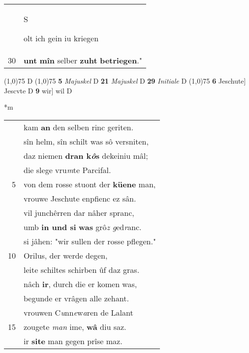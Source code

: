 \documentclass[8pt,a4paper,notitlepage]{article}
\begin{document}
\begin{table}[ht]
\begin{minipage}[t]{0.5\linewidth}
\begin{tabular}{rl}
 & \begin{large}S\end{large}olt ich gein iu kriegen\\ 
30 & \textbf{unt} \textbf{mîn} selber \textbf{zuht} \textbf{betriegen}."\\ 
\end{tabular}
\scriptsize
\line(1,0){75} \newline
D \newline
\line(1,0){75} \newline
\textbf{5} \textit{Majuskel} D  \textbf{21} \textit{Majuskel} D  \textbf{29} \textit{Initiale} D  \newline
\line(1,0){75} \newline
\textbf{6} Jeschute] Jescvte D \textbf{9} wir] wil D \newline
\end{minipage}
\hspace{0.5cm}
\begin{minipage}[t]{0.5\linewidth}
\small
\begin{center}*m
\end{center}
\begin{tabular}{rl}
 & kam \textbf{an} den selben rinc geriten.\\ 
 & sîn helm, sîn schilt was sô versniten,\\ 
 & daz niemen \textbf{dran k\textit{ô}s} dekeiniu mâl;\\ 
 & die slege vru\textit{m}te Parcifal.\\ 
5 & von dem rosse stuont der \textbf{küene} man,\\ 
 & vrouwe Jeschute enpfienc ez sân.\\ 
 & vil junchêrren dar nâher spranc,\\ 
 & umb \textbf{in und si} \textbf{was} grô\textit{z g}ed\textit{r}anc.\\ 
 & si jâhen: "wir sullen der rosse pflegen."\\ 
10 & Orilus, der werde degen,\\ 
 & leite schiltes schirben ûf daz gras.\\ 
 & nâch \textbf{ir}, durch die er komen was,\\ 
 & begunde er vrâgen alle zehant.\\ 
 & vrouwen C\textit{u}nn\textit{e}w\textit{a}ren de Lalant\\ 
15 & zougete \textit{man} ime, \textbf{wâ} diu saz.\\ 
 & ir \textbf{site} man gegen prîse maz.\\ 

\end{tabular}
\end{minipage}
\end{table}
\end{document}
